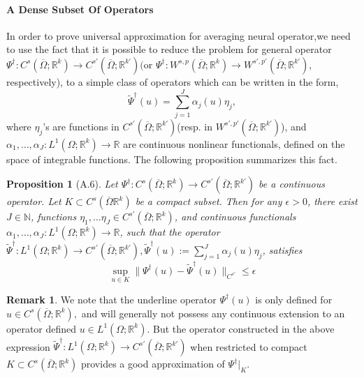 \documentclass[reqno,9pt]{amsart}
\theoremstyle{plain}
\newtheorem{prop}{Proposition}
\theoremstyle{definition}
\newtheorem{rem}{Remark}
\newcommand{\bb}[1]{\mathbb{#1}}
\begin{document}
\paragraph{\bf A Dense Subset Of Operators}
In order to prove universal approximation for averaging neural operator,we need to use the fact that it is possible to reduce the problem for general operator $\Psi^\dag :C^s(\overline{\Omega};\bb R^k) \to C^{s'}(\overline{\Omega};\bb R^{k'})($or $\Psi^\dag :W^{s,p}(\overline{\Omega};\bb R^k) \to W^{s',p'}(\overline{\Omega};\bb R^{k'})$, respectively), to a simple class of operators which can be written in the form,
$$ \tilde{\Psi}^\dag(u) = \sum\limits_{j=1}^{J}\alpha_j(u)\eta_j,$$
where $\eta_j$'s are functions in $C^{s'}(\overline{\Omega};\bb R^{k'})$(resp. in $W^{s',p'}(\overline{\Omega};\bb R^{k'})$), and $\alpha_1,\dots,\alpha_J:L^1(\Omega;\bb R^k) \to \bb R$ are continuous nonlinear functionals, defined on the space of integrable functions. The following proposition summarizes this fact.
\begin{prop}[A.6] \label{A.6}
    Let $\Psi^\dag : C^s(\overline{\Omega};\bb R^k) \to C^{s'}(\overline{\Omega};\bb R^{k'})$ be a continuous operator. Let $K \subset C^s(\overline{\Omega}\bb R^k)$ be a compact subset. Then for any $\epsilon > 0$, there exist $J \in \bb N$, functions $\eta_1,\dots \eta_J \in C^{s'}(\overline{\Omega};\bb R^k)$, and continuous functionals $\alpha_1, \dots, \alpha_J:L^1(\Omega;\bb R^k) \to \bb R$, such that the operator $\tilde{\Psi}^\dag : L^1(\Omega;\bb R^k) \to C^{s'}(\overline{\Omega};\bb R^{k'}), \tilde{\Psi}^\dag(u) := \sum\limits_{j=1}^{J}\alpha_j(u)\eta_j$, satisfies
    $$ \sup\limits_{u \in K}\|\Psi^\dag(u) - \tilde{\Psi}^\dag(u)\|_{C^{s'}} \leq \epsilon$$
\end{prop}
\begin{rem}
    We note that the underline operator $\Psi^\dag(u)$ is only defined for $u \in C^s(\overline{\Omega};\bb R^k),$ and will generally not possess any continuous extension to an operator defined $u \in L^1(\Omega;\bb R^k)$. But the operator constructed in the above expression $\tilde{\Psi}^\dag : L^1(\Omega;\bb R^k) \to C^{s'}(\overline{\Omega};\bb R^{k'})$ when restricted to compact $K \subset C^s(\overline{\Omega};\bb R^k)$ provides a good approximation of $\Psi^\dag |_K$.
\end{rem}
\end{document}
